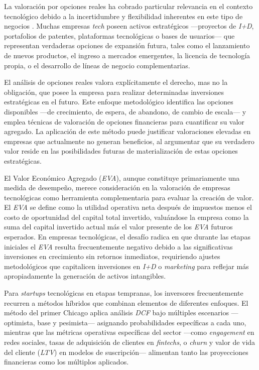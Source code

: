 La valoración por opciones reales ha cobrado particular relevancia en el contexto tecnológico debido a la incertidumbre y flexibilidad inherentes en este tipo de negocios \citep{santos2022}. Muchas empresas \emph{tech} poseen activos estratégicos ---proyectos de \emph{I+D}, portafolios de patentes, plataformas tecnológicas o bases de usuarios--- que representan verdaderas opciones de expansión futura, tales como el lanzamiento de nuevos productos, el ingreso a mercados emergentes, la licencia de tecnología propia, o el desarrollo de líneas de negocio complementarias.

El análisis de opciones reales valora explícitamente el derecho, mas no la obligación, que posee la empresa para realizar determinadas inversiones estratégicas en el futuro. Este enfoque metodológico identifica las opciones disponibles ---de crecimiento, de espera, de abandono, de cambio de escala--- y emplea técnicas de valoración de opciones financieras para cuantificar su valor agregado. La aplicación de este método puede justificar valoraciones elevadas en empresas que actualmente no generan beneficios, al argumentar que su verdadero valor reside en las posibilidades futuras de materialización de estas opciones estratégicas.

El Valor Económico Agregado (\emph{EVA}), aunque constituye primariamente una medida de desempeño, merece consideración en la valoración de empresas tecnológicas como herramienta complementaria para evaluar la creación de valor. El \emph{EVA} se define como la utilidad operativa neta después de impuestos menos el costo de oportunidad del capital total invertido, valuándose la empresa como la suma del capital invertido actual más el valor presente de los \emph{EVA} futuros esperados. En empresas tecnológicas, el desafío radica en que durante las etapas iniciales el \emph{EVA} resulta frecuentemente negativo debido a las significativas inversiones en crecimiento sin retornos inmediatos, requiriendo ajustes metodológicos que capitalicen inversiones en \emph{I+D} o \emph{marketing} para reflejar más apropiadamente la generación de activos intangibles.

Para \emph{startups} tecnológicas en etapas tempranas, los inversores frecuentemente recurren a métodos híbridos que combinan elementos de diferentes enfoques. El método del primer Chicago aplica análisis \emph{DCF} bajo múltiples escenarios ---optimista, base y pesimista--- asignando probabilidades específicas a cada uno, mientras que las métricas operativas específicas del sector ---como \emph{engagement} en redes sociales, tasas de adquisición de clientes en \emph{fintechs}, o \emph{churn} y valor de vida del cliente (\emph{LTV}) en modelos de suscripción--- alimentan tanto las proyecciones financieras como los múltiplos aplicados.

